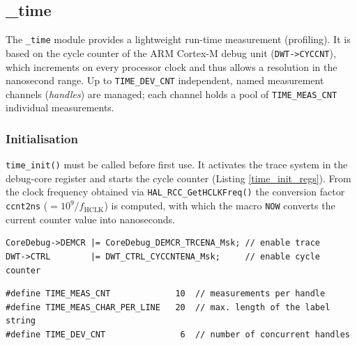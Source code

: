 \subsection{\_time}\label{time}
The \verb|_time| module provides a lightweight run-time measurement
(profiling). It is based on the cycle counter of the ARM Cortex-M debug unit
(\verb|DWT->CYCCNT|), which increments on every processor clock and thus
allows a resolution in the nanosecond range. Up to \verb|TIME_DEV_CNT|
independent, named measurement channels (\emph{handles}) are managed; each
channel holds a pool of \verb|TIME_MEAS_CNT| individual measurements.

\subsubsection*{Initialisation}
\verb|time_init()| must be called before first use. It activates the trace
system in the debug-core register and starts the cycle counter (Listing
\ref{time_init_regs}). From the clock frequency obtained via
\verb|HAL_RCC_GetHCLKFreq()| the conversion factor \verb|ccnt2ns|
($= 10^9 / f_{\mathrm{HCLK}}$) is computed, with which the macro \verb|NOW|
converts the current counter value into nanoseconds.

\begin{listing}
\begin{verbatim}
CoreDebug->DEMCR |= CoreDebug_DEMCR_TRCENA_Msk; // enable trace
DWT->CTRL        |= DWT_CTRL_CYCCNTENA_Msk;     // enable cycle counter
\end{verbatim}
\caption{Enabling the DWT cycle counter in \texttt{time\_init()}}
\label{time_init_regs}
\end{listing}

\begin{listing}
\begin{verbatim}
#define TIME_MEAS_CNT             10  // measurements per handle
#define TIME_MEAS_CHAR_PER_LINE   20  // max. length of the label string
#define TIME_DEV_CNT               6  // number of concurrent handles
\end{verbatim}
\caption{Configuration constants from \texttt{\_time.h}}
\label{time_defines}
\end{listing}

